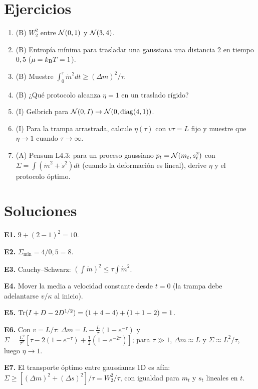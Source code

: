 \documentclass[11pt,a4paper]{article}
\begin{document}
\section{Ejercicios}
\begin{enumerate}[label=\textbf{E\arabic*.}]
\item (B) $W_2^2$ entre $\mathcal{N}(0,1)$ y $\mathcal{N}(3,4)$.
\item (B) Entropía mínima para trasladar una gaussiana una distancia 2 en tiempo $0{,}5$ ($\mu=k_{\mathrm B} T=1$).
\item (B) Muestre $\int_0^\tau\dot m^2dt\ge(\Delta m)^2/\tau$.
\item (B) ¿Qué protocolo alcanza $\eta=1$ en un traslado rígido?
\item (I) Gelbrich para $\mathcal{N}(0,I)\to\mathcal{N}(0,\operatorname{diag}(4,1))$.
\item (I) Para la trampa arrastrada, calcule $\eta(\tau)$ con $v\tau=L$ fijo y muestre que $\eta\to1$ cuando $\tau\to\infty$.
\item (A) Pensum L4.3: para un proceso gaussiano $p_t=\mathcal{N}(m_t,s_t^2)$ con $\Sigma=\int(\dot m^2+\dot s^2)dt$ (cuando la deformación es lineal), derive $\eta$ y el protocolo óptimo.
\end{enumerate}
\section{Soluciones}
\begin{solucion}
\textbf{E1.} $9+(2-1)^2=10$.

\textbf{E2.} $\Sigma_{\min}=4/0{,}5=8$.

\textbf{E3.} Cauchy--Schwarz: $(\int\dot m)^2\le\tau\int\dot m^2$.

\textbf{E4.} Mover la media a velocidad constante desde $t=0$ (la trampa debe adelantarse $v/\kappa$ al inicio).

\textbf{E5.} $\operatorname{Tr}(I+D-2D^{1/2})=(1+4-4)+(1+1-2)=1$.

\textbf{E6.} Con $v=L/\tau$: $\Delta m=L-\frac L\tau(1-e^{-\tau})$ y $\Sigma=\frac{L^2}{\tau^2}[\tau-2(1-e^{-\tau})+\frac12(1-e^{-2\tau})]$; para $\tau\gg1$, $\Delta m\approx L$ y $\Sigma\approx L^2/\tau$, luego $\eta\to1$.

\textbf{E7.} El transporte óptimo entre gaussianas 1D es afín: $\Sigma\ge[(\Delta m)^2+(\Delta s)^2]/\tau=W_2^2/\tau$, con igualdad para $m_t$ y $s_t$ lineales en $t$.
\end{solucion}
\end{document}

